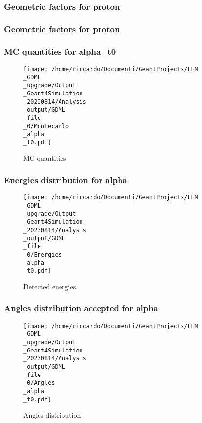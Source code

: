 \documentclass[8pt]{beamer}
\begin{document}
            \begin{frame}
                \frametitle{Geometric factors for proton}
            
            \end{frame}
            
            \begin{frame}
                \frametitle{Geometric factors for proton}
            
            \end{frame}
            
            \begin{frame}
                \frametitle{MC quantities for alpha\_t0}
            
        \begin{figure}[h]
            \centering
            \texttt{[image: /home/riccardo/Documenti/GeantProjects/LEM\\\_GDML\\\_upgrade/Output\\\_Geant4Simulation\\\_20230814/Analysis\\\_output/GDML\\\_file\\\_0/Montecarlo\\\_alpha\\\_t0.pdf]}
            \caption{MC quantities}
        \end{figure}
        
            \end{frame}
            
            \begin{frame}
                \frametitle{Energies distribution for alpha}
            
        \begin{figure}[h]
            \centering
            \texttt{[image: /home/riccardo/Documenti/GeantProjects/LEM\\\_GDML\\\_upgrade/Output\\\_Geant4Simulation\\\_20230814/Analysis\\\_output/GDML\\\_file\\\_0/Energies\\\_alpha\\\_t0.pdf]}
            \caption{Detected energies}
        \end{figure}
        
            \end{frame}
            
            \begin{frame}
                \frametitle{Angles distribution accepted for alpha}
            
        \begin{figure}[h]
            \centering
            \texttt{[image: /home/riccardo/Documenti/GeantProjects/LEM\\\_GDML\\\_upgrade/Output\\\_Geant4Simulation\\\_20230814/Analysis\\\_output/GDML\\\_file\\\_0/Angles\\\_alpha\\\_t0.pdf]}
            \caption{Angles distribution}
        \end{figure}
        
            \end{frame}
            
\end{document}
